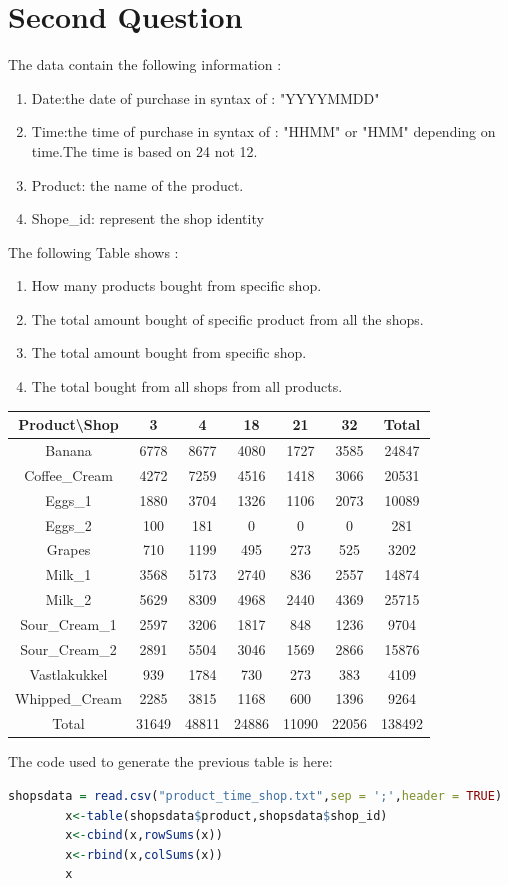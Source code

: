 \documentclass{article}
\begin{document}
		{\centering \section*{Second Question}}					\begin{flushleft}
		The data contain the following information : 
		\begin{enumerate}
			\item Date:the date of purchase in syntax of : "YYYYMMDD"
			\item Time:the time of purchase in syntax of : "HHMM" or "HMM" depending on time.The time is based on 24 not 12.
			\item Product: the name of the product.
			\item Shope\_id: represent the shop identity
		\end{enumerate}	
		The following Table shows : 
		\begin{enumerate}
			\item How many products bought from specific shop.
			\item The total amount bought of specific product from all the shops.
			\item The total amount bought from specific shop.
			\item The total bought from all shops from all products.
		\end{enumerate}
		\begin{tabular}{|c|c|c|c|c|c|c|}
			\hline
Product\textbackslash Shop&3&4&18&21&32& Total\\ \hline
Banana&6778&8677&4080&1727&3585&24847\\ \hline
Coffee\_Cream&4272&7259&4516&1418&3066&20531\\ \hline
Eggs\_1&1880&3704&1326&1106&2073&10089\\ \hline
Eggs\_2&100&181&0&0&0&281\\ \hline
Grapes&710&1199&495&273&525&3202\\ \hline
Milk\_1&3568&5173&2740&836&2557&14874\\ \hline
Milk\_2&5629&8309&4968&2440&4369&25715\\ \hline
Sour\_Cream\_1&2597&3206&1817&848&1236&9704\\ \hline
Sour\_Cream\_2&2891&5504&3046&1569&2866&15876\\ \hline
Vastlakukkel&939&1784&730&273&383&4109\\ \hline
Whipped\_Cream&2285&3815&1168&600&1396&9264\\ \hline
Total&31649&48811&24886&11090&22056&138492\\ \hline
		\end{tabular}
		
		The code used to generate the previous table is here:
		\begin{lstlisting}[language=R]
		shopsdata = read.csv("product_time_shop.txt",sep = ';',header = TRUE)
		x<-table(shopsdata$product,shopsdata$shop_id)
		x<-cbind(x,rowSums(x))
		x<-rbind(x,colSums(x))
		x
		\end{lstlisting}
	\end{flushleft}
\end{document}
